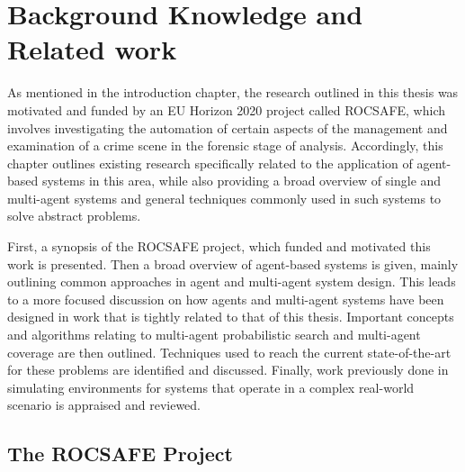 

\chapter{Background Knowledge and Related work}\label{chapter:Background}

\workinprogress
As mentioned in the introduction chapter, the research outlined in this thesis was motivated and funded by an EU Horizon 2020 project called ROCSAFE, which involves investigating the automation of certain aspects of the management and examination of a crime scene in the forensic stage of analysis. Accordingly, this chapter outlines existing research specifically related to the application of agent-based systems in this area, while also providing a broad overview of single and multi-agent systems and general techniques commonly used in such systems to solve abstract problems. \par
First, a synopsis of the ROCSAFE project, which funded and motivated this work is presented. Then a broad overview of agent-based systems is given, mainly outlining common approaches in agent and multi-agent system design. This leads to a more focused discussion on how agents and multi-agent systems have been designed in work that is tightly related to that of this thesis. Important concepts and algorithms relating to multi-agent probabilistic search and multi-agent coverage are then outlined. Techniques used to reach the current state-of-the-art for these problems are identified and discussed. Finally, work previously done in simulating environments for systems that operate in a complex real-world scenario is appraised and reviewed.


\section{The ROCSAFE Project}



